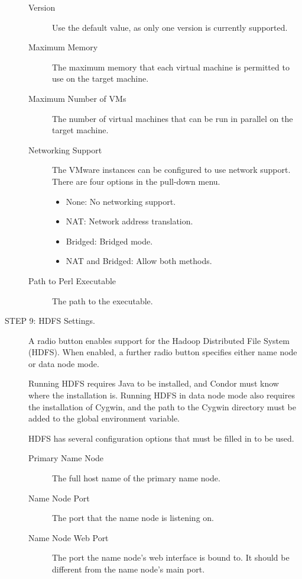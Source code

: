 \begin{description}
     \begin{description}
     \item[Version]
     Use the default value, as only one version is currently supported.
     \item[Maximum Memory]
     The maximum memory that each virtual machine is permitted to use 
     on the target machine.
     \item[Maximum Number of VMs]
     The number of virtual machines that can be run in parallel 
     on the target machine.
     \item[Networking Support]
     The VMware instances can be configured to use network support.
     There are four options in the pull-down menu.
          \begin{itemize}
          \item None: No networking support.
          \item NAT: Network address translation.
          \item Bridged: Bridged mode.
          \item NAT and Bridged: Allow both methods.
          \end{itemize}
     \item[Path to Perl Executable]
     The path to the  executable.
     \end{description}

\item[STEP 9: HDFS Settings.]
     A radio button enables support for 
     the Hadoop Distributed File System (HDFS).
     When enabled, a further radio button specifies 
     either name node or data node mode.

     Running HDFS requires Java to be installed,
     and Condor must know where the installation is.
     Running HDFS in data node mode also requires the installation of Cygwin,
     and the path to the Cygwin directory must be added to the 
     global  environment variable.

     HDFS has several configuration options that must be filled in to be used.
     \begin{description}
     \item[Primary Name Node]
     The full host name of the primary name node.
     \item[Name Node Port]
     The port that the name node is listening on.
     \item[Name Node Web Port]
     The port the name node's web interface is bound to.
     It should be different from the name node's main port.
     \end{description}


\end{description}
